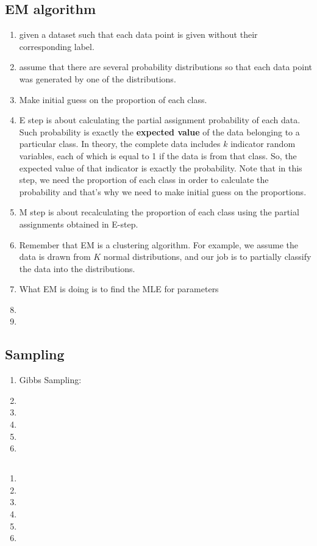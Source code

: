 \documentclass[12pt, landscape]{article}
\begin{document}
\begin{multicols}{2}
\subsection{EM algorithm}
\begin{enumerate}
	\item given a dataset such that each data point is given without their corresponding label. 
	\item assume that there are several probability distributions so that each data point was generated by one of the distributions. 
	\item Make initial guess on the proportion of each class.
	\item E step is about calculating the partial assignment probability of each data. Such probability is exactly the \textbf{expected value} of the data belonging to a particular class. In theory, the complete data includes $k$ indicator random variables, each of which is equal to 1 if the data is from that class. So, the expected value of that indicator is exactly the probability. Note that in this step, we need the proportion of each class in order to calculate the probability and that's why we need to make initial guess on the proportions.
	\item M step is about recalculating the proportion of each class using the partial assignments obtained in E-step.
	\item Remember that EM is a clustering algorithm. For example, we assume the data is drawn from $K$ normal distributions, and our job is to partially classify the data into the distributions. 
	\item What EM is doing is to find the MLE for parameters 
	\item
	\item
\end{enumerate}

\subsection{Sampling}
\begin{enumerate}
	\item Gibbs Sampling: 
	\item
	\item
	\item
	\item
	\item
\end{enumerate}

\subsection{}
\begin{enumerate}
	\item 
	\item
	\item
	\item
	\item
	\item
\end{enumerate}


\end{multicols}
\end{document}
